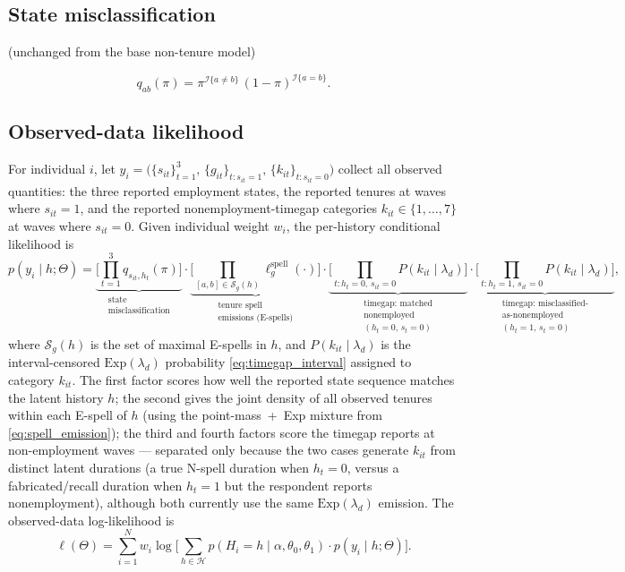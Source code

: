 \documentclass[12pt]{article}
\begin{document}
\subsection{State misclassification} (unchanged from the base non-tenure model)

\begin{equation}
q_{ab}(\pi) = \pi^{\mathcal{I}\{a \neq b\}}\,(1-\pi)^{\mathcal{I}\{a=b\}}.
\end{equation}

\subsection{Observed-data likelihood}

For individual \(i\), let
\(y_i = \big(\{s_{it}\}_{t=1}^3,\, \{g_{it}\}_{t:s_{it}=1},\,
\{k_{it}\}_{t:s_{it}=0}\big)\) collect all observed quantities: the
three reported employment states, the reported tenures at waves where
\(s_{it}=1\), and the reported nonemployment-timegap categories
\(k_{it} \in \{1,\dots,7\}\) at waves where \(s_{it}=0\).
Given individual weight \(w_i\), the per-history conditional likelihood is
\begin{equation}
p(y_i \mid h; \Theta) =
\underbrace{\Big[\prod_{t=1}^3 q_{s_{it},h_t}(\pi)\Big]}_{\substack{\text{state}\\\text{misclassification}}} \cdot
\underbrace{\Big[\prod_{[a,b] \in \mathcal{S}_g(h)} \ell^{\mathrm{spell}}_g(\cdot)\Big]}_{\substack{\text{tenure spell}\\\text{emissions (E-spells)}}} \cdot
\underbrace{\Big[\prod_{t : h_t=0,\,s_{it}=0} P(k_{it} \mid \lambda_d)\Big]}_{\substack{\text{timegap: matched}\\\text{nonemployed}\\(h_t{=}0,\,s_t{=}0)}} \cdot
\underbrace{\Big[\prod_{t : h_t=1,\,s_{it}=0} P(k_{it} \mid \lambda_d)\Big]}_{\substack{\text{timegap: misclassified-}\\\text{as-nonemployed}\\(h_t{=}1,\,s_t{=}0)}},
\end{equation}
where \(\mathcal{S}_g(h)\) is the set of maximal E-spells in \(h\), and
\(P(k_{it} \mid \lambda_d)\) is the interval-censored
\(\mathrm{Exp}(\lambda_d)\) probability \eqref{eq:timegap_interval}
assigned to category \(k_{it}\). The first factor scores how well the
reported state sequence matches the latent history \(h\); the second
gives the joint density of all observed tenures within each E-spell of
\(h\) (using the point-mass~+~Exp mixture from \eqref{eq:spell_emission});
the third and fourth factors score the timegap reports at non-employment
waves --- separated only because the two cases generate \(k_{it}\) from
distinct latent durations (a true N-spell duration when \(h_t = 0\),
versus a fabricated/recall duration when \(h_t = 1\) but the respondent
reports nonemployment), although both currently use the same
\(\mathrm{Exp}(\lambda_d)\) emission. The
observed-data log-likelihood is
\begin{equation}
\ell(\Theta) = \sum_{i=1}^N w_i \log\bigg[\sum_{h \in \mathcal{H}} p(H_i = h \mid \alpha,\theta_0,\theta_1) \cdot p(y_i \mid h; \Theta)\bigg].
\end{equation}
\end{document}
